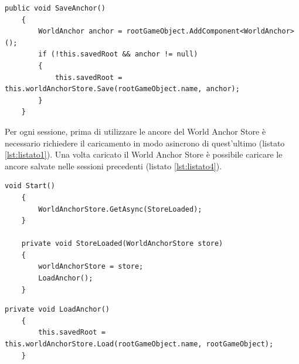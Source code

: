 \begin{lstlisting}[caption={Metodo richiamato per salvare l'ancora dell'ologramma associato.}, label=lst:listato3]
    public void SaveAnchor()
    {
        WorldAnchor anchor = rootGameObject.AddComponent<WorldAnchor>();
        if (!this.savedRoot && anchor != null)
        {
            this.savedRoot = this.worldAnchorStore.Save(rootGameObject.name, anchor);
        }
    }
\end{lstlisting}

Per ogni sessione, prima di utilizzare le ancore del World Anchor Store è necessario richiedere il caricamento in modo asincrono di quest'ultimo (listato \ref{lst:listato1}). Una volta caricato il World Anchor Store è possibile caricare le ancore salvate nelle sessioni precedenti (listato \ref{lst:listato4}).

\begin{lstlisting}[caption={Metodo richiamato una volta caricato il World Anchor Store.}, label=lst:listato1]
    void Start()
    {
        WorldAnchorStore.GetAsync(StoreLoaded);
    }

    private void StoreLoaded(WorldAnchorStore store)
    {
        worldAnchorStore = store;
        LoadAnchor();
    }
\end{lstlisting}

\begin{lstlisting}[caption={Metodo richiamato per reperire l'ancora dal World Anchor Store.}, label=lst:listato4]
    private void LoadAnchor()
    {
        this.savedRoot = this.worldAnchorStore.Load(rootGameObject.name, rootGameObject);
    }
\end{lstlisting}